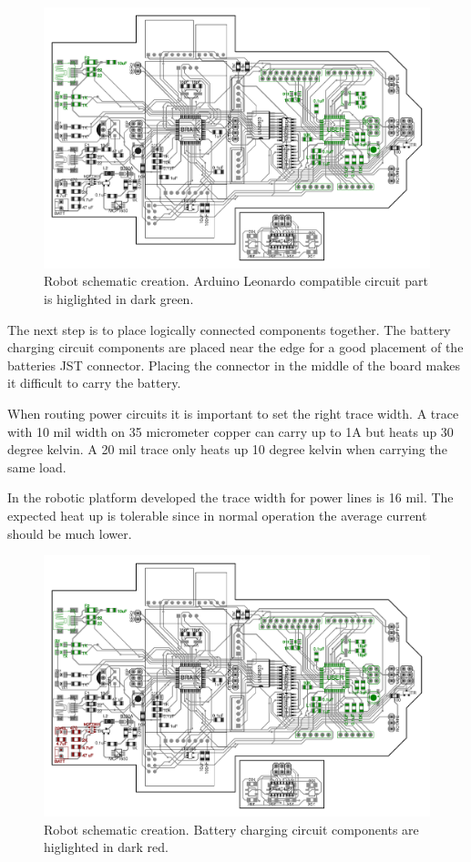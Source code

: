 \documentclass[11pt,a4paper]{article}
\begin{document}
\begin{figure}[H]
  \centering
  \includegraphics[width=\textwidth]{robot_schematic_user.pdf}
  \caption{Robot schematic creation. Arduino Leonardo compatible circuit part is higlighted in dark green.}
\end{figure}

The next step is to place logically connected components together. The battery charging circuit components are placed near the edge for a good placement of the batteries JST connector. Placing the connector in the middle of the board makes it difficult to carry the battery.

When routing power circuits it is important to set the right trace width. A trace with 10 mil width on 35 micrometer copper can carry up to 1A but heats up 30 degree kelvin. A 20 mil trace only heats up 10 degree kelvin when carrying the same load. \cite[p. 841]{horowitz1989art} 

In the robotic platform developed the trace width for power lines is 16 mil. The expected heat up is tolerable since in normal operation the average current should be much lower.

\begin{figure}[H]
  \centering
  \includegraphics[width=\textwidth]{robot_schematic_battery.pdf}
  \caption{Robot schematic creation. Battery charging circuit components are higlighted in dark red.}
\end{figure}
\end{document}
